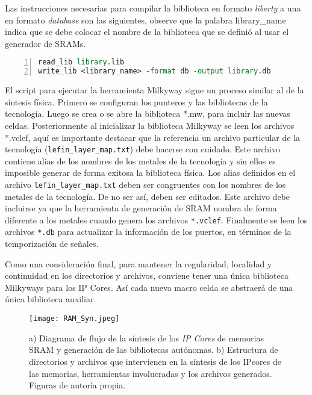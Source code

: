 Las instrucciones necesarias para compilar la biblioteca en formato \textit{liberty} a una en formato \textit{database} son las siguientes, observe que la palabra library\_name indica que se debe colocar el nombre de la biblioteca que se definió al usar el generador de SRAMs.

\begin{lstlisting}[language= tcl, numbers=left, keywordstyle=\color{blue}, commentstyle=\color{mygreen}]
read_lib library.lib
write_lib <library_name> -format db -output library.db
\end{lstlisting}


El script para ejecutar la herramienta Milkyway sigue un proceso similar al de la síntesis física. Primero se configuran los punteros y las bibliotecas de la tecnología. Luego se crea o se abre la biblioteca *.mw, para incluir las nuevas celdas. Posteriormente al inicializar la biblioteca Milkyway se leen los archivos *.vclef, aquí es importante destacar que la referencia un archivo particular de la tecnología (\texttt{lefin\_layer\_map.txt}) debe hacerse con cuidado. Este archivo contiene alias de los nombres de los metales de la tecnología y sin ellos es imposible generar de forma exitosa la biblioteca física. Los alias definidos en el archivo \texttt{lefin\_layer\_map.txt} deben ser congruentes con los nombres de los metales de la tecnología. De no ser así, deben ser editados. Este archivo debe incluirse ya que la herramienta de generación de SRAM nombra de forma diferente a los metales cuando genera los archivos \texttt{*.vclef}. Finalmente se leen los archivos \texttt{*.db} para actualizar la información de los puertos, en términos de la temporización de señales.

Como una consideración final, para mantener la regularidad, localidad y continuidad en los directorios y archivos, conviene tener una única biblioteca Milkyways para los IP Cores. Así cada nueva macro celda se abstraerá de una única biblioteca auxiliar.

\begin{figure}[ht]
\texttt{[image: RAM\_Syn.jpeg]}
\centering
\caption{a) Diagrama de flujo de la síntesis de los \textit{IP Cores} de memorias SRAM y generación de las bibliotecas autónomas. \newline b) Estructura de directorios y archivos que intervienen en la síntesis de los IPcores de las memorias, herramientas involucradas y los archivos generados. Figuras de autoría propia.}
\end{figure}

